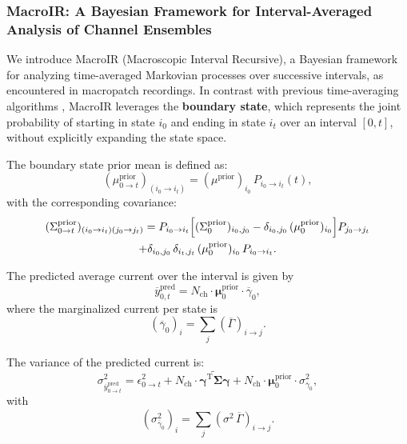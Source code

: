 \documentclass[pdflatex,sn-nature]{sn-jnl}%
\theoremstyle{thmstyleone}%
\theoremstyle{thmstyletwo}%
\theoremstyle{thmstylethree}%
\begin{document}
\subsubsection{MacroIR: A Bayesian Framework for Interval-Averaged Analysis of Channel Ensembles}

We introduce MacroIR (Macroscopic Interval Recursive), a Bayesian framework for analyzing time-averaged Markovian processes over successive intervals, as encountered in macropatch recordings. In contrast with previous time-averaging algorithms \cite{Munch2022}, 
MacroIR leverages the \textbf{boundary state}, which represents the joint probability of starting in state \(i_0\) and ending in state \(i_t\) over an interval \([0,t]\), without explicitly expanding the state space.

The boundary state prior mean is defined as:
\begin{equation}
	(\mu^{\text{prior}}_{0 \rightarrow t})_{(i_0 \rightarrow i_t)} = (\mu^{\text{prior}})_{i_0} \, P_{i_0 \rightarrow i_t}(t),
	\label{eq:boundary_mean_prior}
\end{equation}
with the corresponding covariance:
\begin{multline}
	(\Sigma^{\text{prior}}_{0 \rightarrow t})_{(i_0 \rightarrow i_t)(j_0 \rightarrow j_t)} = P_{i_0 \rightarrow i_t}\Bigl[(\Sigma^{\text{prior}}_0)_{i_0,j_0} - \delta_{i_0,j_0}\, (\mu^{\text{prior}}_0)_{i_0}\Bigr] P_{j_0 \rightarrow j_t} \\
	+ \delta_{i_0,j_0}\,\delta_{i_t,j_t}\, (\mu^{\text{prior}}_0)_{i_0}\, P_{i_0 \rightarrow i_t}.
	\label{eq:boundary_covariance_prior}
\end{multline}

The predicted average current over the interval is given by
\begin{equation}
	\overline{y}^{\text{pred}}_{0,t} = N_{\text{ch}} \cdot \mathbf{\mu}^{\text{prior}}_{0} \cdot \overline{\gamma}_{0},
	\label{eq:macro_interval_predicted_y}
\end{equation}
where the marginalized current per state is
\begin{equation}
	(\overline{\gamma}_{0})_i = \sum_j (\overline{\Gamma})_{i \rightarrow j}.
\end{equation}

The variance of the predicted current is:
\begin{equation}
	\sigma^2_{\overline{y}^{\text{pred}}_{0 \rightarrow t}} = \epsilon^2_{0 \rightarrow t} + N_{\text{ch}} \cdot \widetilde{\mathbf{\gamma}^{\mathrm{T}} \mathbf{\Sigma}\mathbf{\gamma}} + N_{\text{ch}} \cdot \mathbf{\mu}^{\text{prior}}_{0} \cdot \sigma^2_{\overline{\gamma}_{0}},
	\label{eq:macro_interval_sigma_pred}
\end{equation}
with
\begin{equation}
	(\sigma^2_{\overline{\gamma}_{0}})_i = \sum_j (\sigma^2\,\overline{\Gamma})_{i \rightarrow j}.
\end{equation}
\end{document}
